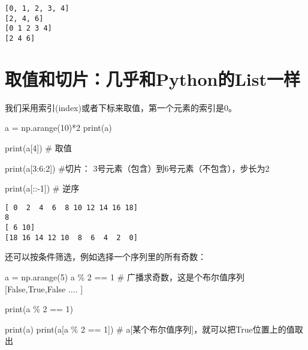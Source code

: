 \documentclass[
  letterpaper,
  DIV=11,
  numbers=noendperiod]{scrreprt}
\newenvironment{Shaded}{\begin{snugshade}}{\end{snugshade}}
\newcommand{\BuiltInTok}[1]{\textcolor[rgb]{0.00,0.23,0.31}{#1}}
\newcommand{\CommentTok}[1]{\textcolor[rgb]{0.37,0.37,0.37}{#1}}
\newcommand{\DecValTok}[1]{\textcolor[rgb]{0.68,0.00,0.00}{#1}}
\newcommand{\NormalTok}[1]{\textcolor[rgb]{0.00,0.23,0.31}{#1}}
\newcommand{\OperatorTok}[1]{\textcolor[rgb]{0.37,0.37,0.37}{#1}}
\begin{document}
\begin{verbatim}
[0, 1, 2, 3, 4]
[2, 4, 6]
[0 1 2 3 4]
[2 4 6]
\end{verbatim}

\hypertarget{ux53d6ux503cux548cux5207ux7247ux51e0ux4e4eux548cpythonux7684listux4e00ux6837}{%
\section{取值和切片：几乎和Python的List一样}\label{ux53d6ux503cux548cux5207ux7247ux51e0ux4e4eux548cpythonux7684listux4e00ux6837}}

我们采用索引(index)或者下标来取值，第一个元素的索引是0。

\begin{Shaded}
\begin{Highlighting}[]
\NormalTok{a }\OperatorTok{=}\NormalTok{ np.arange(}\DecValTok{10}\NormalTok{)}\OperatorTok{*}\DecValTok{2}
\BuiltInTok{print}\NormalTok{(a)}

\BuiltInTok{print}\NormalTok{(a[}\DecValTok{4}\NormalTok{]) }\CommentTok{\# 取值}

\BuiltInTok{print}\NormalTok{(a[}\DecValTok{3}\NormalTok{:}\DecValTok{6}\NormalTok{:}\DecValTok{2}\NormalTok{]) }\CommentTok{\#切片： 3号元素（包含）到6号元素（不包含），步长为2}

\BuiltInTok{print}\NormalTok{(a[::}\OperatorTok{{-}}\DecValTok{1}\NormalTok{]) }\CommentTok{\# 逆序}
\end{Highlighting}
\end{Shaded}

\begin{verbatim}
[ 0  2  4  6  8 10 12 14 16 18]
8
[ 6 10]
[18 16 14 12 10  8  6  4  2  0]
\end{verbatim}

还可以按条件筛选，例如选择一个序列里的所有奇数：

\begin{Shaded}
\begin{Highlighting}[]
\NormalTok{a }\OperatorTok{=}\NormalTok{ np.arange(}\DecValTok{5}\NormalTok{) }
\NormalTok{a }\OperatorTok{\%} \DecValTok{2} \OperatorTok{==} \DecValTok{1} \CommentTok{\# 广播求奇数，这是个布尔值序列 [False,True,False .... ] }

\BuiltInTok{print}\NormalTok{(a }\OperatorTok{\%} \DecValTok{2} \OperatorTok{==} \DecValTok{1}\NormalTok{)}

\BuiltInTok{print}\NormalTok{(a)}
\BuiltInTok{print}\NormalTok{(a[a }\OperatorTok{\%} \DecValTok{2} \OperatorTok{==} \DecValTok{1}\NormalTok{])  }\CommentTok{\# a[某个布尔值序列]，就可以把True位置上的值取出}
\end{Highlighting}
\end{Shaded}
\end{document}
